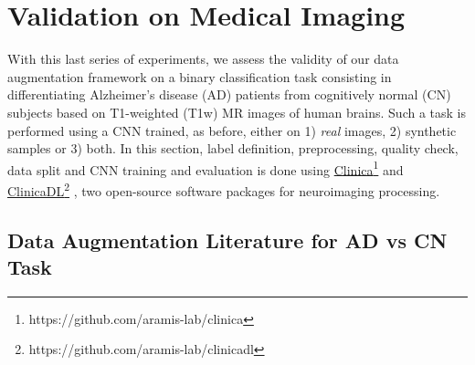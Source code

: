 \documentclass[10pt,journal,compsoc]{IEEEtran}
\begin{document}
\section{Validation on Medical Imaging}\label{Sec: Medical images}
With this last series of experiments, we assess the validity of our data augmentation framework on a binary classification task consisting in differentiating Alzheimer's disease (AD) patients from cognitively normal (CN) subjects based on T1-weighted (T1w) MR images of human brains. Such a task is performed using a CNN trained, as before, either on 1) \emph{real} images, 2) synthetic samples or 3) both. In this section, label definition, preprocessing, quality check, data split and CNN training and evaluation is done using \href{https://github.com/aramis-lab/clinica}{Clinica}\footnote{https://github.com/aramis-lab/clinica} \cite{routierClinicaOpenSourceSoftware2021} and \href{https://github.com/aramis-lab/clinicadl}{ClinicaDL}\footnote{https://github.com/aramis-lab/clinicadl} \cite{thibeau-sutreClinicaDLOpensourceDeep2021}, two open-source software packages for neuroimaging processing.

% 

 
\subsection{Data Augmentation Literature for AD vs CN Task}
\end{document}
